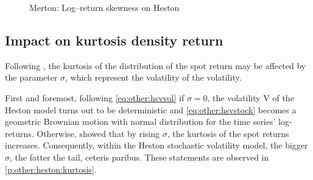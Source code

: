 \documentclass[a4paper, 12pt]{report}
\begin{document}
\begin{figure}[ht]
\centering

\caption{Merton: Log--return skewness on Heston}
\label{p:other:heston:skewness}
\end{figure}

\subsection{Impact on kurtosis density return}
\label{sub:hestonkurtosis}

Following \citet{heston1993}, the kurtosis of the distribution of the spot return may be affected by the parameter $\sigma$, which represent the volatility of the volatility.

First and foremost, following \cref{eq:other:hsvvol} if $\sigma = 0$, the volatility V of the Heston model turns out to be deterministic and \cref{eq:other:hsvstock}  becomes a geometric Brownian motion with normal distribution for the time series' log-returns.
Otherwise, \citet{heston1993} showed that by rising $\sigma$, the kurtosis of the spot returns increases. Consequently, within the Heston stochastic volatility model, the bigger $\sigma$, the fatter the tail, ceteris paribus. These statements are observed in \cref{p:other:heston:kurtosis}.
\end{document}
